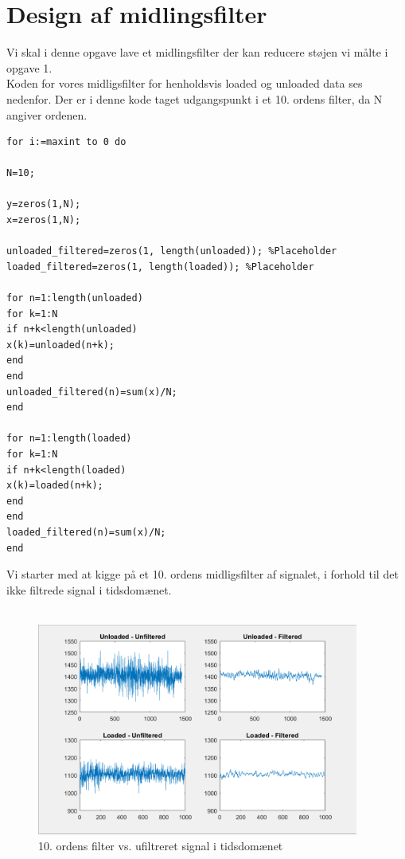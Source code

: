 \graphicspath{{Chapters/Opgave2/}}

\chapter{Design af midlingsfilter}


Vi skal i denne opgave lave et midlingsfilter der kan reducere støjen vi målte i opgave 1. \\
Koden for vores midligsfilter for henholdsvis loaded og unloaded data ses nedenfor. Der er i denne kode taget udgangspunkt i et 10. ordens filter, da N angiver ordenen.

\begin{lstlisting}[frame=single]  % Start your code-block
for i:=maxint to 0 do

N=10;

y=zeros(1,N);
x=zeros(1,N);

unloaded_filtered=zeros(1, length(unloaded)); %Placeholder
loaded_filtered=zeros(1, length(loaded)); %Placeholder

for n=1:length(unloaded)
for k=1:N
if n+k<length(unloaded)
x(k)=unloaded(n+k);
end
end
unloaded_filtered(n)=sum(x)/N;
end

for n=1:length(loaded)
for k=1:N
if n+k<length(loaded)
x(k)=loaded(n+k);
end
end
loaded_filtered(n)=sum(x)/N;
end

\end{lstlisting}

Vi starter med at kigge på et 10. ordens midligsfilter af signalet, i forhold til det ikke filtrede signal i tidsdomænet.\\
\\
\begin{figure}[H]
	\centering
	\includegraphics[width = 300pt]{Img/10_ordensfilter.PNG}
	\caption{10. ordens filter vs. ufiltreret signal i tidsdomænet}
	\label{fig:10_ordensfilter}
\end{figure}

